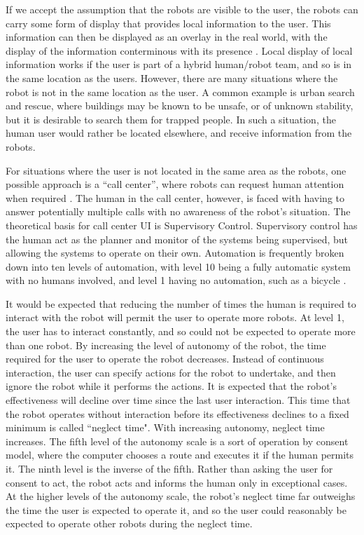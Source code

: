 \documentclass[]{article}
\begin{document}
If we accept the assumption that the robots are visible to the user, the robots can carry some form of display that provides local information to the user. 
This information can then be displayed as an overlay in the real world, with the display of the information conterminous with its presence \cite{Daily:2003:WEI:820752.821587}. 
Local display of local information works if the user is part of a hybrid human/robot team, and so is in the same location as the users. 
However, there are many situations where the robot is not in the same location as the user. 
A common example is urban search and rescue, where buildings may be known to be unsafe, or of unknown stability, but it is desirable to search them for trapped people. 
In such a situation, the human user would rather be located elsewhere, and receive information from the robots. 

For situations where the user is not located in the same area as the robots, one possible approach is a ``call center'', where robots can request human attention when required \cite{chen2011supervisory}. 
The human in the call center, however, is faced with having to answer potentially multiple calls with no awareness of the robot's situation. 
The theoretical basis for call center UI is Supervisory Control. 
Supervisory control has the human act as the planner and monitor of the systems being supervised, but allowing the systems to operate on their own.
Automation is frequently broken down into ten levels of automation, with level 10 being a fully automatic system with no humans involved, and level 1 having no automation, such as a bicycle \cite{parasuraman2000model}. 

It would be expected that reducing the number of times the human is required to interact with the robot will permit the user to operate more robots.
At level 1, the user has to interact constantly, and so could not be expected to operate more than one robot. 
By increasing the level of autonomy of the robot, the time required for the user to operate the robot decreases.
Instead of continuous interaction, the user can specify actions for the robot to undertake, and then ignore the robot while it performs the actions.
It is expected that the robot's effectiveness will decline over time since the last user interaction. 
This time that the robot operates without interaction before its effectiveness declines to a fixed minimum is called ``neglect time"\cite{olsen2003metrics}.
With increasing autonomy, neglect time increases.
The fifth level of the autonomy scale is a sort of operation by consent model, where the computer chooses a route and executes it if the human permits it. 
The ninth level is the inverse of the fifth.
Rather than asking the user for consent to act, the robot acts and informs the human only in exceptional cases. 
At the higher levels of the autonomy scale, the robot's neglect time far outweighs the time the user is expected to operate it, and so the user could reasonably be expected to operate other robots during the neglect time. 
\end{document}
